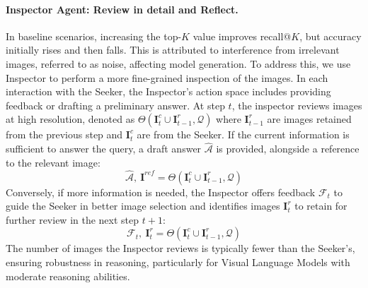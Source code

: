 \paragraph{Inspector Agent: Review in detail and Reflect.}
In baseline scenarios, increasing the top-$K$ value improves recall@$K$, but accuracy initially rises and then falls. This is attributed to interference from irrelevant images, referred to as noise, affecting model generation. To address this, we use Inspector to perform a more fine-grained inspection of the images. In each interaction with the Seeker, the Inspector's action space includes providing feedback or drafting a preliminary answer. 
At step $t$, the inspector reviews images at high resolution, denoted as $\Theta(\mathbf{I}^c_t \cup \mathbf{I}^{r}_{t-1}, \mathcal{Q})$ where $\mathbf{I}^{r}_{t-1}$ are images retained from the previous step and $\mathbf{I}^{c}_{t}$ are from the Seeker.
If the current information is sufficient to answer the query, a draft answer $\hat{\mathcal{A}}$ is provided, alongside a reference to the relevant image:
\begin{equation}
\hat{\mathcal{A}},~\mathbf{I}^{ref} = \Theta(\mathbf{I}^c_t \cup \mathbf{I}^{r}_{t-1}, \mathcal{Q})
\end{equation}
Conversely, if more information is needed, the Inspector offers feedback $\mathcal{F}_{t}$ to guide the Seeker in better image selection and identifies images $\mathbf{I}^r_t$ to retain for further review in the next step $t+1$:
\begin{equation}
    \mathcal{F}_t,~\mathbf{I}^r_t = \Theta(\mathbf{I}^c_t \cup \mathbf{I}^{r}_{t-1}, \mathcal{Q})
\end{equation}
The number of images the Inspector reviews is typically fewer than the Seeker's, ensuring robustness in reasoning, particularly for Visual Language Models with moderate reasoning abilities.

% 


